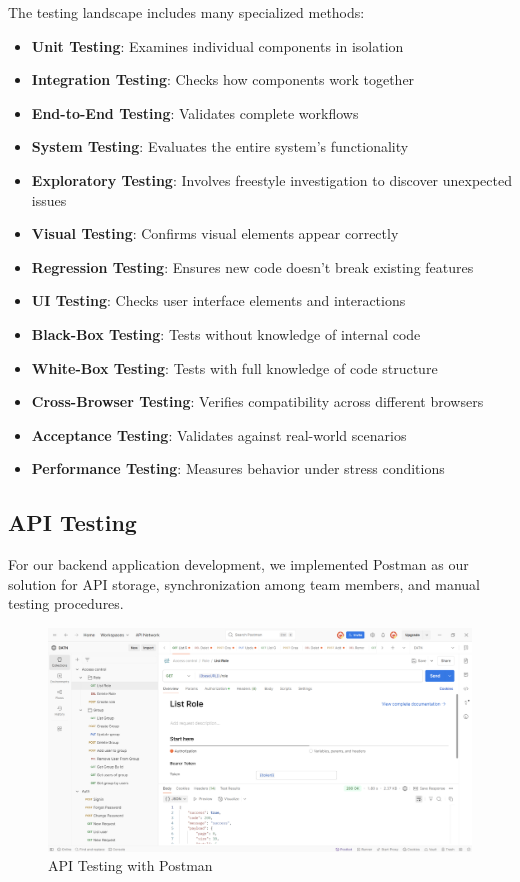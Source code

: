 The testing landscape includes many specialized methods:

\begin{itemize}
    \item \textbf{Unit Testing}: Examines individual components in isolation
    \item \textbf{Integration Testing}: Checks how components work together
    \item \textbf{End-to-End Testing}: Validates complete workflows
    \item \textbf{System Testing}: Evaluates the entire system's functionality
    \item \textbf{Exploratory Testing}: Involves freestyle investigation to discover unexpected issues
    \item \textbf{Visual Testing}: Confirms visual elements appear correctly
    \item \textbf{Regression Testing}: Ensures new code doesn't break existing features
    \item \textbf{UI Testing}: Checks user interface elements and interactions
    \item \textbf{Black-Box Testing}: Tests without knowledge of internal code
    \item \textbf{White-Box Testing}: Tests with full knowledge of code structure
    \item \textbf{Cross-Browser Testing}: Verifies compatibility across different browsers
    \item \textbf{Acceptance Testing}: Validates against real-world scenarios
    \item \textbf{Performance Testing}: Measures behavior under stress conditions
\end{itemize}
\subsection{API Testing}
For our backend application development, we implemented Postman \cite{postman_api_testing} as our solution for API storage, synchronization among team members, and manual testing procedures.
\begin{figure}[H]
    \centering
    \includegraphics[width=15cm]{graphics/chapter6/postmain.png}
    \caption{API Testing with Postman}
    \label{fig:postman}
\end{figure}
